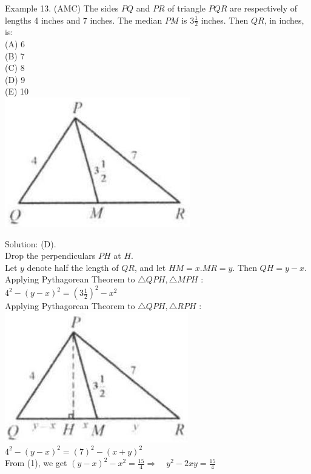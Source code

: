 \documentclass[10pt]{article}
\begin{document}
Example 13. (AMC) The sides \(P Q\) and \(P R\) of triangle \(P Q R\) are respectively of lengths 4 inches and 7 inches. The median \(P M\) is \(3 \frac{1}{2}\) inches. Then \(Q R\), in inches, is:\\
(A) 6\\
(B) 7\\
(C) 8\\
(D) 9\\
(E) 10\\
\includegraphics[max width=\textwidth, center]{2025_04_17_97bc1f7e44d93c271a88g-082}

Solution: (D).\\
Drop the perpendiculars \(P H\) at \(H\).\\
Let \(y\) denote half the length of \(Q R\), and let \(H M=x . M R=y\). Then \(Q H=y-x\).\\
Applying Pythagorean Theorem to \(\triangle Q P H, \triangle M P H\) :\\
\(4^{2}-(y-x)^{2}=\left(3 \frac{1}{2}\right)^{2}-x^{2}\)\\
Applying Pythagorean Theorem to \(\triangle Q P H, \triangle R P H\) :\\
\includegraphics[max width=\textwidth, center]{2025_04_17_97bc1f7e44d93c271a88g-082(1)}\\
\(4^{2}-(y-x)^{2}=(7)^{2}-(x+y)^{2}\)\\
From (1), we get \((y-x)^{2}-x^{2}=\frac{15}{4} \Rightarrow \quad y^{2}-2 x y=\frac{15}{4}\)
\end{document}
